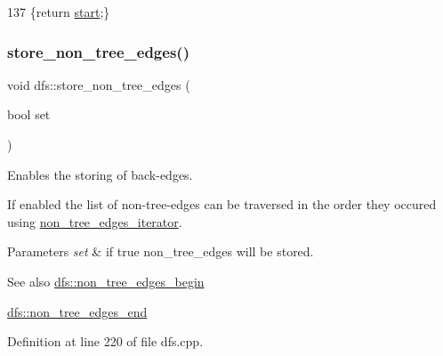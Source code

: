 \begin{DoxyCode}
137 \{\textcolor{keywordflow}{return} \mbox{\hyperlink{classdfs_af677cfc31fe06a18dd3a3aae7f7d112b}{start}};\}
\end{DoxyCode}
\mbox{\label{classdfs_a6f54f1c4339eacc8961e795439d4593d}} 
\subsubsection{\texorpdfstring{store\+\_\+non\+\_\+tree\+\_\+edges()}{store\_non\_tree\_edges()}\hspace{0.1cm}{\footnotesize\ttfamily [1/2]}}
{\footnotesize\ttfamily void dfs\+::store\+\_\+non\+\_\+tree\+\_\+edges (\begin{DoxyParamCaption}\item[{bool}]{set }\end{DoxyParamCaption})\hspace{0.3cm}{\ttfamily [inherited]}}



Enables the storing of back-\/edges. 

If enabled the list of non-\/tree-\/edges can be traversed in the order they occured using \mbox{\hyperlink{classdfs_a95e353f354d3b31daded0c4fe749171a}{non\+\_\+tree\+\_\+edges\+\_\+iterator}}.


\begin{DoxyParams}{Parameters}
{\em set} & if true non\+\_\+tree\+\_\+edges will be stored. \\
\hline
\end{DoxyParams}
\begin{DoxySeeAlso}{See also}
\mbox{\hyperlink{classdfs_a4efe5bb72d00305e6b226e67c2b2ef6e}{dfs\+::non\+\_\+tree\+\_\+edges\+\_\+begin}} 

\mbox{\hyperlink{classdfs_ad9cd92a18bda23edca8ab3ac60a15ef4}{dfs\+::non\+\_\+tree\+\_\+edges\+\_\+end}} 
\end{DoxySeeAlso}


Definition at line 220 of file dfs.\+cpp.


